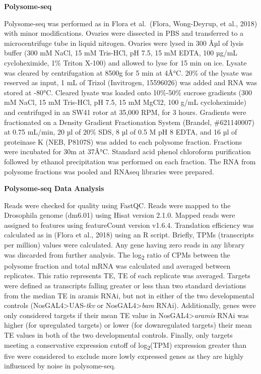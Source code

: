 \documentclass[12pt,oneside]{reedthesis}
\begin{document}
\textbf{Polysome-seq}

Polysome-seq was performed as in Flora et al.~(Flora, Wong-Deyrup, et al., 2018) with
minor modifications. Ovaries were dissected in PBS and transferred to a
microcentrifuge tube in liquid nitrogen. Ovaries were lysed in 300 Âµl of
lysis buffer (300 mM NaCl, 15 mM Tris-HCl, pH 7.5, 15 mM EDTA, 100 µg/mL
cycloheximide, 1\% Triton X-100) and allowed to lyse for 15 min on ice.
Lysate was cleared by centrifugation at 8500g for 5 min at 4Â°C. 20\% of
the lysate was reserved as input, 1 mL of Trizol (Invitrogen, 15596026)
was added and RNA was stored at -80°C. Cleared lysate was loaded onto
10\%-50\% sucrose gradients (300 mM NaCl, 15 mM Tris-HCl, pH 7.5, 15 mM
MgCl2, 100 g/mL cycloheximide) and centrifuged in an SW41 rotor at
35,000 RPM, for 3 hours. Gradients were fractionated on a Density
Gradient Fractionation System (Brandel, \#621140007) at 0.75 mL/min, 20
µl of 20\% SDS, 8 µl of 0.5 M pH 8 EDTA, and 16 µl of proteinase K (NEB,
P8107S) was added to each polysome fraction. Fractions were incubated
for 30m at 37Â°C. Standard acid phenol chloroform purification followed
by ethanol precipitation was performed on each fraction. The RNA from
polysome fractions was pooled and RNAseq libraries were prepared.

\textbf{Polysome-seq Data Analysis}

Reads were checked for quality using FastQC. Reads were mapped to the
Drosophila genome (dm6.01) using Hisat version 2.1.0. Mapped reads were
assigned to features using featureCount version v1.6.4. Translation
efficiency was calculated as in (Flora et al., 2018) using an R script.
Briefly, TPMs (transcripts per million) values were calculated. Any gene
having zero reads in any library was discarded from further analysis.
The log\textsubscript{2} ratio of CPMs between the polysome fraction and total mRNA
was calculated and averaged between replicates. This ratio represents
TE, TE of each replicate was averaged. Targets were defined as
transcripts falling greater or less than two standard deviations from
the median TE in aramis RNAi, but not in either of the two developmental
controls (NosGAL4\textgreater UAS-\emph{tkv} or NosGAL4\textgreater{}\emph{bam} RNAi). Additionally,
genes were only considered targets if their mean TE value in
NosGAL4\textgreater{}\emph{aramis} RNAi was higher (for upregulated targets) or lower
(for downregulated targets) their mean TE values in both of the two
developmental controls. Finally, only targets meeting a conservative
expression cutoff of log\textsubscript{2}(TPM) expression greater than five were
considered to exclude more lowly expressed genes as they are highly
influenced by noise in polysome-seq.
\end{document}
